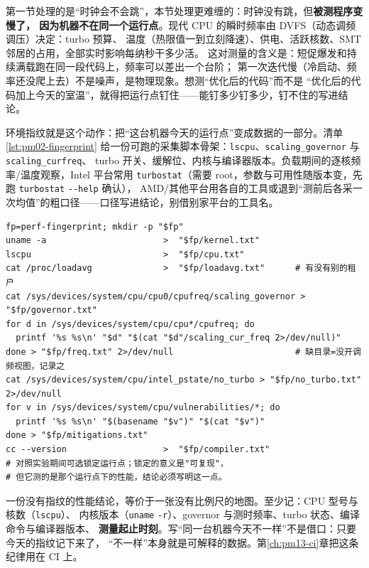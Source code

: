 \documentclass[12pt,a4paper,fontset=fandol]{ctexbook}
\newcommand{\Tp}[1]{\texttt{#1}}
\newcommand{\Opt}[1]{\texttt{-\/-#1}}
\newcommand{\Bk}{\discretionary{}{}{}}
\begin{document}
第一节处理的是``时钟会不会跳''，本节处理更难缠的：时钟没有跳，但\textbf{被测程序变慢了，
因为机器不在同一个运行点}。现代 CPU 的瞬时频率由 DVFS（动态调频调压）决定：turbo 预算、
温度（热限值一到立刻降速）、供电、活跃核数、SMT 邻居的占用，全部实时影响每纳秒干多少活。
这对测量的含义是：短促爆发和持续满载跑在同一段代码上，频率可以差出一个台阶；
第一次迭代慢（冷启动、频率还没爬上去）不是噪声，是物理现象。想测``优化后的代码''而不是
``优化后的代码加上今天的室温''，就得把运行点钉住——能钉多少钉多少，钉不住的写进结论。

环境指纹就是这个动作：把``这台机器今天的运行点''变成数据的一部分。清单 \ref{lst:pm02-fingerprint}
给一份可跑的采集脚本骨架：\Tp{lscpu}、\Tp{scaling{\Bk}\_governor} 与 \Tp{scaling{\Bk}\_cur{\Bk}freq}、
turbo 开关、缓解位、内核与编译器版本。负载期间的逐核频率/温度观察，Intel 平台常用
\Tp{turbostat}（需要 root，参数与可用性随版本变，先跑 \Tp{turbostat} \Opt{help} 确认），
AMD/其他平台用各自的工具或退到``测前后各采一次均值''的粗口径——口径写进结论，别借别家平台的工具名。

\begin{lstlisting}[style=shellstyle, title={采集环境指纹（骨架：字段随发行版不同，缺项记录而不是跳过）}, label={lst:pm02-fingerprint}]
fp=perf-fingerprint; mkdir -p "$fp"
uname -a                       >  "$fp/kernel.txt"
lscpu                          >  "$fp/cpu.txt"
cat /proc/loadavg              >  "$fp/loadavg.txt"      # 有没有别的租户
cat /sys/devices/system/cpu/cpu0/cpufreq/scaling_governor > "$fp/governor.txt"
for d in /sys/devices/system/cpu/cpu*/cpufreq; do
  printf '%s %s\n' "$d" "$(cat "$d"/scaling_cur_freq 2>/dev/null)"
done > "$fp/freq.txt" 2>/dev/null                        # 缺目录=没开调频视图，记录之
cat /sys/devices/system/cpu/intel_pstate/no_turbo > "$fp/no_turbo.txt" 2>/dev/null
for v in /sys/devices/system/cpu/vulnerabilities/*; do
  printf '%s %s\n' "$(basename "$v")" "$(cat "$v")"
done > "$fp/mitigations.txt"
cc --version                   >  "$fp/compiler.txt"
# 对照实验期间可选锁定运行点；锁定的意义是"可复现"，
# 但它测的是那个运行点下的性能，结论必须写明这一点。
\end{lstlisting}

\begin{guideline}[title={环境指纹是结论的一部分，不是附录的装饰品}]
一份没有指纹的性能结论，等价于一张没有比例尺的地图。至少记：CPU 型号与核数（\Tp{lscpu}）、
内核版本（\Tp{uname} \Tp{-r}）、governor 与测时频率、turbo 状态、编译命令与编译器版本、
\textbf{测量起止时刻}。写``同一台机器今天不一样''不是借口：只要今天的指纹记下来了，
``不一样''本身就是可解释的数据。第\ref{ch:pm13-ci}章把这条纪律用在 CI 上。
\end{guideline}
\end{document}
